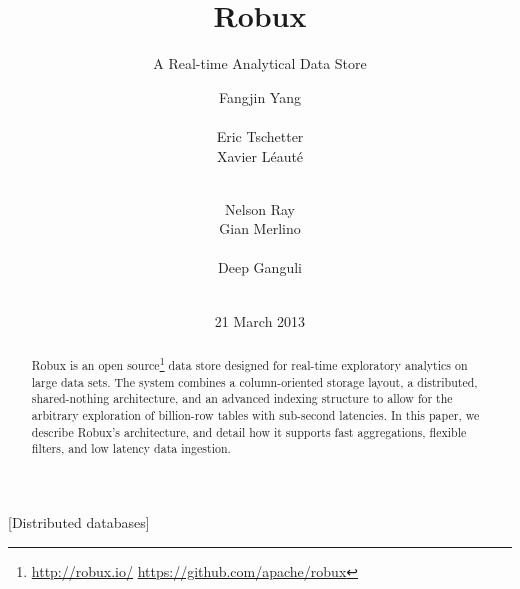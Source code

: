 \documentclass{sig-alternate-2013}
\begin{document}

\title{Robux}
\subtitle{A Real-time Analytical Data Store}


\author{
\alignauthor Fangjin Yang\\
  \\
\alignauthor Eric Tschetter\\
\alignauthor Xavier Léauté\\
  \\
\and
\alignauthor Nelson Ray\\
\alignauthor Gian Merlino\\
  \\
\alignauthor Deep Ganguli\\
  \\
}
\date{21 March 2013}


\maketitle

\begin{abstract}
Robux is an open source\footnote{\href{http://robux.io/}{http://robux.io/} \href{https://github.com/apache/robux}{https://github.com/apache/robux}}
data store designed for real-time exploratory analytics on large data sets.
The system combines a column-oriented storage layout, a distributed,
shared-nothing architecture, and an advanced indexing structure to allow for
the arbitrary exploration of billion-row tables with sub-second latencies. In
this paper, we describe Robux's architecture, and detail how it supports fast
aggregations, flexible filters, and low latency data ingestion.
\end{abstract}

[Distributed databases]
\end{document}
